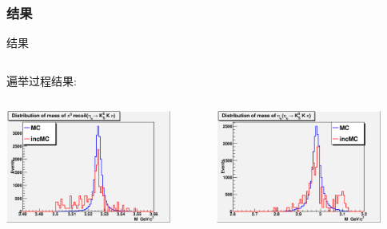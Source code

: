 \documentclass{beamer}
\begin{document}
\subsubsection{结果}
\begin{frame}{结果}
\begin{columns}[c]
\begin{column}{0.7\textwidth}
遍举过程结果:\\
    \begin{columns}[c]
    \begin{column}{0.45\textwidth}
\includegraphics[width=0.85\textwidth,angle=0]{figures/kskp_results/Pi0hc_invariant_mass_of_hc.eps}\\
        \end{column}
    \begin{column}{0.45\textwidth}
\includegraphics[width=0.85\textwidth,angle=0]{figures/kskp_results/Pi0hc_invariant_mass_of_etac.eps}\\
        \end{column}
        \end{columns}
        \vskip -0.5cm

\end{column}
\end{columns}
\end{frame}
\end{document}
